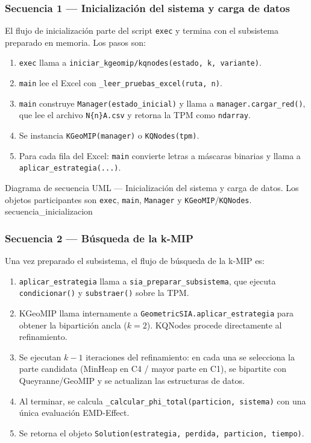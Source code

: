 \subsubsection*{Secuencia 1 — Inicialización del sistema y carga de datos}

El flujo de inicialización parte del script \texttt{exec} y termina con el
subsistema preparado en memoria. Los pasos son:

\begin{enumerate}
  \item \texttt{exec} llama a \texttt{iniciar\_kgeomip/kqnodes(estado, k, variante)}.
  \item \texttt{main} lee el Excel con \texttt{\_leer\_pruebas\_excel(ruta, n)}.
  \item \texttt{main} construye \texttt{Manager(estado\_inicial)} y llama a
        \texttt{manager.cargar\_red()}, que lee el archivo \texttt{N\{n\}A.csv}
        y retorna la TPM como \texttt{ndarray}.
  \item Se instancia \texttt{KGeoMIP(manager)} o \texttt{KQNodes(tpm)}.
  \item Para cada fila del Excel: \texttt{main} convierte letras a máscaras
        binarias y llama a \texttt{aplicar\_estrategia(...)}.
\end{enumerate}

%
  {Diagrama de secuencia UML — Inicialización del sistema y carga de datos.
   Los objetos participantes son \texttt{exec}, \texttt{main}, \texttt{Manager}
   y \texttt{KGeoMIP}/\texttt{KQNodes}.}%
  {secuencia_inicializacion}

\subsubsection*{Secuencia 2 — Búsqueda de la k-MIP}

Una vez preparado el subsistema, el flujo de búsqueda de la k-MIP es:

\begin{enumerate}
  \item \texttt{aplicar\_estrategia} llama a \texttt{sia\_preparar\_subsistema},
        que ejecuta \texttt{condicionar()} y \texttt{substraer()} sobre la TPM.
  \item KGeoMIP llama internamente a \texttt{GeometricSIA.aplicar\_estrategia}
        para obtener la bipartición ancla ($k=2$). KQNodes procede directamente
        al refinamiento.
  \item Se ejecutan $k-1$ iteraciones del refinamiento: en cada una se selecciona
        la parte candidata (MinHeap en C4 / mayor parte en C1), se bipartite con
        Queyranne/GeoMIP y se actualizan las estructuras de datos.
  \item Al terminar, se calcula \texttt{\_calcular\_phi\_total(particion, sistema)}
        con una única evaluación EMD-Effect.
  \item Se retorna el objeto \texttt{Solution(estrategia, perdida, particion, tiempo)}.
\end{enumerate}

